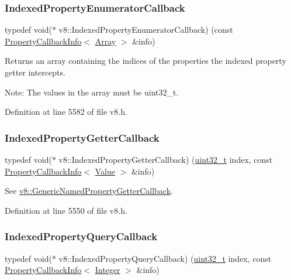 \subsubsection{\texorpdfstring{Indexed\+Property\+Enumerator\+Callback}{IndexedPropertyEnumeratorCallback}}
{\footnotesize\ttfamily typedef void($\ast$ v8\+::\+Indexed\+Property\+Enumerator\+Callback) (const \mbox{\hyperlink{classv8_1_1PropertyCallbackInfo}{Property\+Callback\+Info}}$<$ \mbox{\hyperlink{classv8_1_1Array}{Array}} $>$ \&info)}

Returns an array containing the indices of the properties the indexed property getter intercepts.

Note\+: The values in the array must be uint32\+\_\+t. 

Definition at line 5582 of file v8.\+h.

\mbox{\label{namespacev8_a48e7816ba64447bf32a25d194588daaf}} 
\subsubsection{\texorpdfstring{Indexed\+Property\+Getter\+Callback}{IndexedPropertyGetterCallback}}
{\footnotesize\ttfamily typedef void($\ast$ v8\+::\+Indexed\+Property\+Getter\+Callback) (\mbox{\hyperlink{classuint32__t}{uint32\+\_\+t}} index, const \mbox{\hyperlink{classv8_1_1PropertyCallbackInfo}{Property\+Callback\+Info}}$<$ \mbox{\hyperlink{classv8_1_1Value}{Value}} $>$ \&info)}

See {\ttfamily \mbox{\hyperlink{namespacev8_a24b1801fa53a7c5a71366d8044927563}{v8\+::\+Generic\+Named\+Property\+Getter\+Callback}}}. 

Definition at line 5550 of file v8.\+h.

\mbox{\label{namespacev8_a980b62c33eb664783e61e25c3b27f9ee}} 
\subsubsection{\texorpdfstring{Indexed\+Property\+Query\+Callback}{IndexedPropertyQueryCallback}}
{\footnotesize\ttfamily typedef void($\ast$ v8\+::\+Indexed\+Property\+Query\+Callback) (\mbox{\hyperlink{classuint32__t}{uint32\+\_\+t}} index, const \mbox{\hyperlink{classv8_1_1PropertyCallbackInfo}{Property\+Callback\+Info}}$<$ \mbox{\hyperlink{classv8_1_1Integer}{Integer}} $>$ \&info)}

